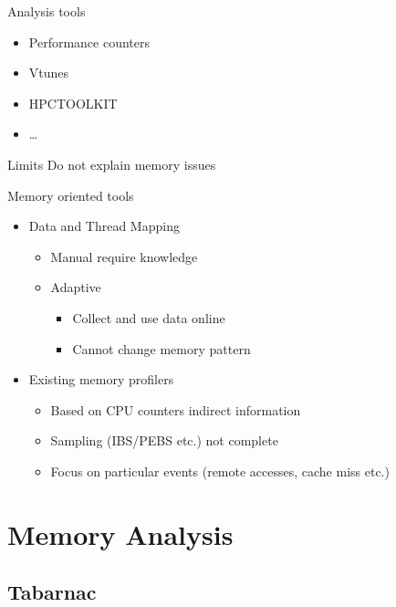 \documentclass[xcolor={usenames,dvipsnames}]{beamer}
\makeatletter
\newcommand{\alertitem}{\item<+-|alert@+->}
\makeatother
\begin{document}
\begin{frame}{Analysis tools}
    \begin{itemize}
        \item Performance counters~\cite{Treibig10LIKWID} 
        \item Vtunes~\cite{Reinders05VTune}
        \item HPCTOOLKIT~\cite{Adhianto10HPCTOOLKIT}
        \item \ldots
    \end{itemize}
    \pause
    \begin{alertblock}{Limits}
            Do not explain memory issues
    \end{alertblock}
\end{frame}
\begin{frame}{Memory oriented tools}
    \begin{itemize}[<+->]
        \item Data and Thread Mapping
            \begin{itemize}
                \item Manual \alert{require knowledge}
                \item  Adaptive~\cite{Diener13CommunicationBased,Levinthal2009}
                    \begin{itemize}
                        \item Collect and use data online
                        \alertitem Cannot change memory pattern
                    \end{itemize}
            \end{itemize}
        \item Existing memory
            profilers~\cite{Lachaize12MemProf,Gimenez14Dissecting,Liu14Tool}
            \begin{itemize}
                \item Based on CPU counters \alert{indirect information}
                \item Sampling (IBS/PEBS etc.) \alert{not complete}
                \item \alert{Focus on particular events} (remote accesses,
                    cache miss etc.)
            \end{itemize}
    \end{itemize}
\end{frame}
\section{Memory Analysis}
\subsection{Tabarnac}
\end{document}
